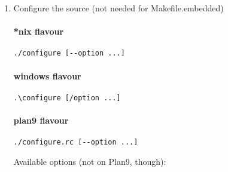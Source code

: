 \begin{enumerate}
\item Configure the source (not needed for Makefile.embedded)

\paragraph{*nix flavour}
\begin{lstlisting}
./configure [--option ...]
\end{lstlisting}

\paragraph{windows flavour}

\begin{lstlisting}
.\configure [/option ...]
\end{lstlisting}

\paragraph{plan9 flavour}

\begin{lstlisting}
./configure.rc [--option ...]
\end{lstlisting}


Available options (not on Plan9, though):


\end{enumerate}

